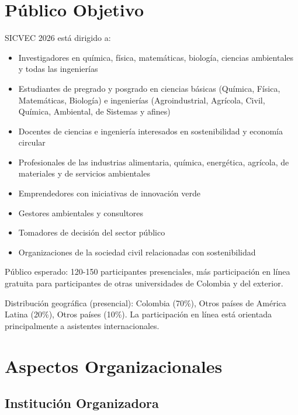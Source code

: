 \documentclass[12pt,a4paper]{article}
\begin{document}
\section{Público Objetivo}

SICVEC 2026 está dirigido a:

\begin{itemize}[label={\textcolor{verdeosc}{\textbullet}}]
  \item Investigadores en química, física, matemáticas, biología, ciencias ambientales y todas las ingenierías
  \item Estudiantes de pregrado y posgrado en ciencias básicas (Química, Física, Matemáticas, Biología) e ingenierías (Agroindustrial, Agrícola, Civil, Química, Ambiental, de Sistemas y afines)
  \item Docentes de ciencias e ingeniería interesados en sostenibilidad y economía circular
  \item Profesionales de las industrias alimentaria, química, energética, agrícola, de materiales y de servicios ambientales
  \item Emprendedores con iniciativas de innovación verde
  \item Gestores ambientales y consultores
  \item Tomadores de decisión del sector público
  \item Organizaciones de la sociedad civil relacionadas con sostenibilidad
\end{itemize}

Público esperado: 120-150 participantes presenciales, más participación en línea gratuita para participantes de otras universidades de Colombia y del exterior.

Distribución geográfica (presencial): Colombia (70\%), Otros países de América Latina (20\%), Otros países (10\%). La participación en línea está orientada principalmente a asistentes internacionales.

\section{Aspectos Organizacionales}

\subsection{Institución Organizadora}
\end{document}
